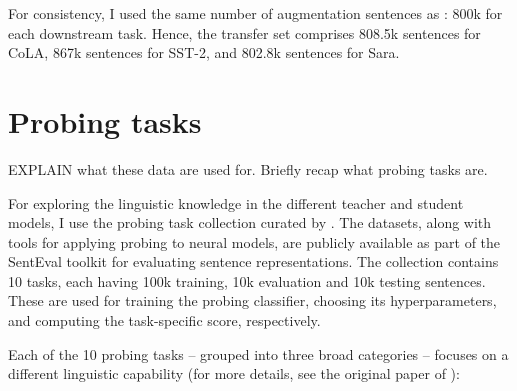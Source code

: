 \documentclass[bsc,frontabs,twoside,singlespacing,parskip,deptreport]{infthesis}
\begin{document}
{{    For consistency, I used the same number of augmentation sentences as \citet{Tang_2019a}: 800k for each downstream task. Hence, the transfer set comprises 808.5k sentences for CoLA, 867k sentences for SST-2, and 802.8k sentences for Sara.
  }

  \section{Probing tasks}{
    EXPLAIN what these data are used for.
    Briefly recap what probing tasks are.

    For exploring the linguistic knowledge in the different teacher and student models, I use the probing task collection curated by \citet{Conneau_2018}.
    The datasets, along with tools for applying probing to neural models, are publicly available as part of the SentEval toolkit \citet{SentEval-paper} for evaluating sentence representations.
    The collection contains 10 tasks, each having 100k training, 10k evaluation and 10k testing sentences. These are used for training the probing classifier, choosing its hyperparameters, and computing the task-specific score, respectively.

    Each of the 10 probing tasks -- grouped into three broad categories -- focuses on a different linguistic capability (for more details, see the original paper of \citet{Conneau_2018}):
    
}}
\end{document}
